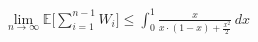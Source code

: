 \documentclass[preview]{standalone}
\begin{document}
\begin{align*}
\lim_{n\to\infty} \mathbb{E} \Bigg[ \sum_{i=1}^{n-1} W_i \Bigg] \leq \int_{0}^{1} \frac{x}{x\cdot (1-x) + \frac{x^2}{2}} \, dx
\end{align*}
\end{document}
